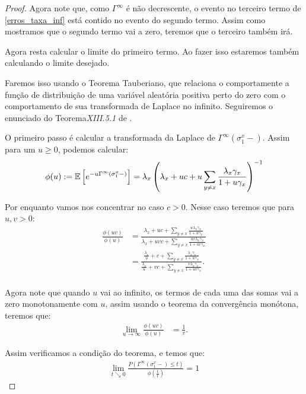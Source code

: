 \begin{proof}
  Agora note que, como $\Gamma^\infty$ é não decrescente, o evento no
  terceiro termo de \eqref{erros_taxa_inf} está contido no evento do
  segundo termo. Assim como mostramos que o segundo termo vai a zero,
  teremos que o terceiro também irá.

  Agora resta calcular o limite do primeiro termo. Ao fazer isso
  estaremos também calculando o limite desejado.


  Faremos isso usando o Teorema Tauberiano, que relaciona o
  comportamente a função de distribuição de uma variável aleatória
  positiva perto do zero com o comportamento de sua transformada de
  Laplace no infinito.  Seguiremos o enunciado do
  Teorema\emph{XIII.5.1} de \cite{fellerv2}.

  O primeiro passo é calcular a transformada da Laplace de
  $\Gamma^\infty(\sigma^x_1-)$. Assim para um $u \geq 0$, podemos
  calcular:
  \begin{align*}
    \phi (u) := {\mathbb{E}} \left[ e^{-u \Gamma^\infty (\sigma^x_1-)}  \right] =
    \lambda_x \left( \lambda_x + uc + u \sum_{y \neq x}
      \frac{\lambda_x \gamma_x}{1 + u\gamma_x}  \right)^{-1}
  \end{align*}

  Por enquanto vamos nos concentrar no caso $c > 0$. Nesse caso
  teremos que para $u, v > 0$:
  \begin{align*}
    \frac{\phi(uv)}{\phi (u)} &= \frac{\lambda_x + uc + \sum_{y \neq
        x} \frac{u \lambda_x\gamma_x}{1 + u \gamma_x}} {\lambda_x + u
      v c + \sum_{y \neq x} \frac{u v
        \lambda_x\gamma_x}{1 + u v \gamma_x}} \\
    &= \frac{\frac{\lambda_x}{u} + c + \sum_{y \neq x}
      \frac{\lambda_x\gamma_x}{1 + u \gamma_x}} {\frac{\lambda_x}{u} +
      v c + \sum_{y \neq x} \frac{v
        \lambda_x\gamma_x}{1 + u v \gamma_x}}. \\
  \end{align*}

  Agora note que quando $u$ vai ao infinito, os termos de cada uma das
  somas vai a zero monotonamente com $u$, assim usando o teorema da
  convergência monótona, teremos que:
  \begin{align*}
      \lim_{u \to \infty} \frac{\phi(uv)}{\phi (u)} &= \frac{1}{v}.
  \end{align*}

  Assim verificamos a condição do teorema, e temos que:
  \begin{align*}
    \lim_{t \searrow 0} \frac{P( \Gamma^\infty(\sigma^x_1-) \leq
      t)}{\phi(\frac{1}{t})} = 1
  \end{align*}


\end{proof}
